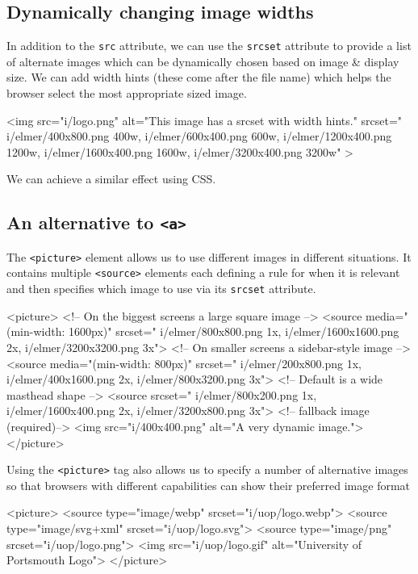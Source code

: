 \subsection*{Dynamically changing image widths}
In addition to the \verb|src| attribute, we can use the \verb|srcset| attribute to provide a list of alternate images which can be dynamically chosen based on image \& display size. We can add width hints (these come after the file name) which helps the browser select the most appropriate sized image.
\begin{html}
<img
    src="i/logo.png"
    alt="This image has a srcset with width hints."
    srcset="
    i/elmer/400x800.png 400w,
    i/elmer/600x400.png 600w,
    i/elmer/1200x400.png 1200w,
    i/elmer/1600x400.png 1600w,
    i/elmer/3200x400.png 3200w"
>
\end{html}

We can achieve a similar effect using CSS. 

\subsection*{An alternative to \texttt{<a>}}
The \verb|<picture>| element allows us to use different images in different situations. It contains multiple \verb|<source>| elements each defining a rule for when it is relevant and then specifies which image to use via its \verb|srcset| attribute.
\begin{html}
<picture>
    <!-- On the biggest screens a large square image  -->
    <source
        media="(min-width: 1600px)"
        srcset="
            i/elmer/800x800.png 1x,
            i/elmer/1600x1600.png 2x,
            i/elmer/3200x3200.png 3x">
    <!-- On smaller screens a sidebar-style image  -->
    <source
        media="(min-width: 800px)"
        srcset="
            i/elmer/200x800.png 1x,
            i/elmer/400x1600.png 2x,
            i/elmer/800x3200.png 3x">
    <!-- Default is a wide masthead shape -->
    <source
        srcset="
            i/elmer/800x200.png 1x,
            i/elmer/1600x400.png 2x,
            i/elmer/3200x800.png 3x">
    <!-- fallback image (required)-->
    <img
        src="i/400x400.png"
        alt="A very dynamic image.">
</picture>
\end{html}

Using the \verb|<picture>| tag also allows us to specify a number of alternative images so that browsers with different capabilities can show their preferred image format
\begin{html}
<picture>
  <source
    type="image/webp"
    srcset="i/uop/logo.webp">
  <source
    type="image/svg+xml"
    srcset="i/uop/logo.svg">
  <source
    type="image/png"
    srcset="i/uop/logo.png">
  <img
    src="i/uop/logo.gif"
    alt="University of Portsmouth Logo">
</picture>
\end{html}


